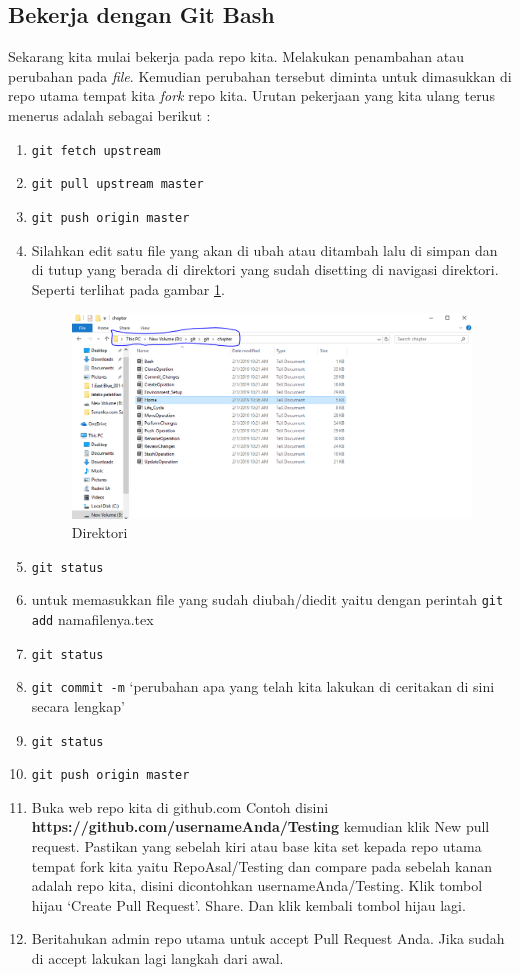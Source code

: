 \subsection{Bekerja dengan Git Bash}
Sekarang kita mulai bekerja pada repo kita. Melakukan penambahan atau perubahan pada \textit{file}. Kemudian perubahan tersebut diminta untuk dimasukkan di repo utama tempat kita \textit{fork} repo kita. Urutan pekerjaan yang kita ulang terus menerus adalah sebagai berikut :
\begin{enumerate}
\item \verb|git fetch upstream|
\item \verb|git pull upstream master|
\item \verb|git push origin master|
\item Silahkan edit satu file yang akan di ubah atau ditambah lalu di simpan dan di tutup yang berada di direktori yang sudah disetting di navigasi direktori. Seperti terlihat pada gambar \ref{penanda}.
    \begin{figure}[!htbp]
        \centering
            \includegraphics[width=.75\textwidth]{Figures/Capture}
            \caption{Direktori}
        \label{penanda}
    \end{figure}
\item \verb|git status|
\item untuk memasukkan file yang sudah diubah/diedit yaitu dengan perintah \verb|git add| namafilenya.tex
\item \verb|git status|
\item \verb|git commit -m| `perubahan apa yang telah kita lakukan di ceritakan di sini secara lengkap'
\item \verb|git status|
\item \verb|git push origin master|
\item Buka web repo kita di github.com
Contoh disini \textbf{https://github.com/usernameAnda/Testing} kemudian klik New pull request. Pastikan yang sebelah kiri atau base kita set kepada repo utama tempat fork kita yaitu RepoAsal/Testing dan compare pada sebelah kanan adalah repo kita, disini dicontohkan usernameAnda/Testing. Klik tombol hijau `Create Pull Request'. Share. Dan klik kembali tombol hijau lagi.
\item Beritahukan admin repo utama untuk accept Pull Request Anda. Jika sudah di accept lakukan lagi langkah dari awal.
\end{enumerate}
